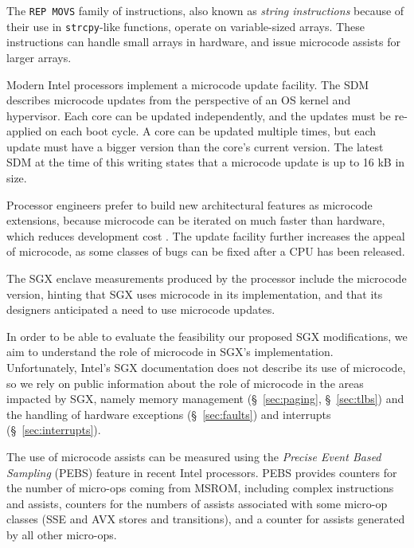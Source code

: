 The \texttt{REP MOVS} family of instructions, also known as \textit{string
instructions} because of their use in \texttt{strcpy}-like functions, operate
on variable-sized arrays. These instructions can handle small arrays in
hardware, and issue microcode assists for larger arrays.


Modern Intel processors implement a microcode update facility. The SDM
describes microcode updates from the perspective of an OS kernel and
hypervisor. Each core can be updated independently, and the updates must be
re-applied on each boot cycle. A core can be updated multiple times, but each
update must have a bigger version than the core's current version. The latest
SDM at the time of this writing states that a microcode update is up to 16 kB
in size.

Processor engineers prefer to build new architectural features as microcode
extensions, because microcode can be iterated on much faster than hardware,
which reduces development cost \cite{intel2008genetic, intel2012clusters}. The
update facility further increases the appeal of microcode, as some classes of
bugs can be fixed after a CPU has been released.

The SGX enclave measurements produced by the processor include the microcode
version, hinting that SGX uses microcode in its implementation, and that its
designers anticipated a need to use microcode updates.

In order to be able to evaluate the feasibility our proposed SGX modifications,
we aim to understand the role of microcode in SGX's implementation.
Unfortunately, Intel's SGX documentation does not describe its use of
microcode, so we rely on public information about the role of microcode in the
areas impacted by SGX, namely memory management (\S~\ref{sec:paging},
\S~\ref{sec:tlbs}) and the handling of hardware exceptions
(\S~\ref{sec:faults}) and interrupts (\S~\ref{sec:interrupts}).


The use of microcode assists can be measured using the
\textit{Precise Event Based Sampling} (PEBS) feature in recent Intel
processors. PEBS provides counters for the number of micro-ops coming from
MSROM, including complex instructions and assists, counters for the numbers of
assists associated with some micro-op classes (SSE and AVX stores and
transitions), and a counter for assists generated by all other micro-ops.

